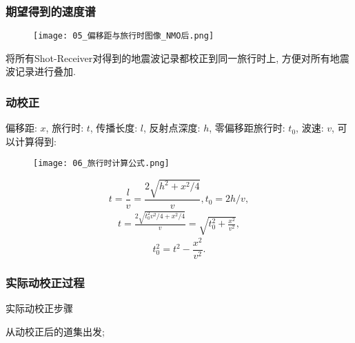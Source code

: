 \documentclass[11pt, professionalfonts]{beamer}
\begin{document}
{\begin{frame}[c]
    \frametitle{期望得到的速度谱}
    \begin{minipage}{.55\paperwidth}
        \begin{figure}[h]
            \centering
            \texttt{[image: 05\_偏移距与旅行时图像\_NMO后.png]}
        \end{figure}
    \end{minipage}
    \begin{minipage}{.35\paperwidth}
        将所有Shot-Receiver对得到的地震波记录都校正到同一旅行时上, 方便对所有地震波记录进行叠加. 
    \end{minipage}
\end{frame}

\begin{frame}[shrink]
    \frametitle{动校正}
    偏移距: $x$, 旅行时: $t$, 传播长度: $l$, 反射点深度: $h$, 零偏移距旅行时: $t_0$, 波速: $v$, 可以计算得到\cite{Green1938}: 

    \vspace{10pt}
    \begin{minipage}{.45\paperwidth}
        \begin{figure}[h]
            \centering
            \texttt{[image: 06\_旅行时计算公式.png]}
        \end{figure}
    \end{minipage}
    \begin{minipage}{.45\paperwidth}
        \small
        \begin{equation*}
            t=\frac{l}{v}=\frac{2\sqrt{h^2+x^2/4}}{v}, t_0=2h/v, 
        \end{equation*}
        \begin{align*}
            t=\frac{2\sqrt{t_0^2v^2/4+x^2/4}}{v}=\sqrt{t_0^2+\frac{x^2}{v^2}}, 
        \end{align*}
        \begin{equation}
            t_0^2=t^2-\frac{x^2}{v^2}. 
            \label{equ:零偏距旅行时计算公式}
        \end{equation}
\end{minipage}
\end{frame}

\renewcommand{\algorithmcfname}{算法}
\begin{frame}[c]
    \frametitle{实际动校正过程}
    \begin{algorithm}[H]
        \caption{实际动校正步骤}
        从动校正后的道集出发; \\
\end{algorithm}
\end{frame}}
\end{document}

